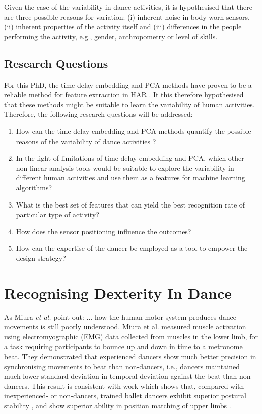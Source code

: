 \documentclass[10pt,journal,compsoc]{IEEEtran}
\begin{document}
Given the case of the variability in dance activities, it is hypothesised that 
there are three possible reasons for variation:
(i) inherent noise in body-worn sensors, 
(ii) inherent properties of the activity itself and
(iii) differences in the people performing the activity, e.g., gender, 
anthropometry or level of skills.

\subsection{Research Questions}
For this PhD, the time-delay embedding and PCA methods
have proven to be a reliable method for feature extraction in HAR
\cite{Gouwanda2012, Sama2013, Frank2010}. It this therefore hypothesised that 
these methods might be suitable to learn the variability of human
activities. Therefore, the following research questions will be addressed:
\begin{enumerate}
\item How can the time-delay embedding and PCA methods quantify 
 the possible reasons of the variability of dance activities ?
\item In the light of limitations of time-delay embedding and PCA,
 which other non-linear analysis tools would be suitable to explore 
 the variability in different human activities and use them as a 
features for machine learning algorithms?
\item What is the best set of features that can yield the best recognition
rate of particular type of activity?
\item How does the sensor positioning influence the outcomes?
\item How can the expertise of the dancer be employed as a tool to empower
the design strategy?
\end{enumerate}



\section{Recognising Dexterity In Dance }
As Miura \textit{et al.} \cite{Miura2015} point out: $\ldots$ how the human motor 
system produces dance movements is still poorly understood. 
Miura et al. \cite{Miura2013} measured muscle activation using 
electromyographic (EMG) data collected from muscles in 
the lower limb, for a task requiring participants to 
bounce up and down in time to a metronome beat. They 
demonstrated that experienced dancers show much better 
precision in synchronising  movements to beat than non-dancers, 
i.e., dancers maintained much lower standard deviation in 
temporal deviation against the beat than non-dancers. 
This result is consistent with work which shows that, compared with inexperienced- or 
non-dancers, trained ballet dancers exhibit superior postural 
stability \cite{Crotts1996}, and show superior ability in position matching 
of upper limbs \cite{Ramsay2001}.
\end{document}
